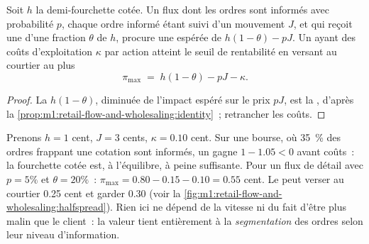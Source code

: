 \begin{proposition}\label{prop:m1:retail-flow-and-wholesaling:maxpay}
Soit $h$ la demi-fourchette cotée. Un flux dont les ordres sont informés avec
probabilité $p$, chaque ordre informé étant suivi d'un mouvement $J$, et qui
reçoit une  d'une fraction $\theta$ de $h$, procure une
 espérée de $h(1-\theta) - pJ$. Un  ayant
des coûts d'exploitation $\kappa$ par action atteint le seuil de rentabilité en versant au courtier au plus
\[
\pi_{\max} \;=\; h(1-\theta) - pJ - \kappa .
\]
\end{proposition}
\begin{proof}
La  $h(1-\theta)$, diminuée de l'impact espéré sur le prix $pJ$, est la
, d'après la \cref{prop:m1:retail-flow-and-wholesaling:identity}~;
retrancher les coûts.
\end{proof}

\begin{example}\label{ex:m1:retail-flow-and-wholesaling:twoflows}
Prenons $h = 1$ cent, $J = 3$ cents, $\kappa = 0.10$ cent. Sur une bourse,
où 35~\% des ordres frappant une cotation sont informés, un  gagne
$1 - 1.05 < 0$ avant coûts~: la fourchette cotée est, à l'équilibre, à peine
suffisante. Pour un flux de détail avec $p = 5\%$ et $\theta = 20\%$~: $\pi_{\max} =
0.80 - 0.15 - 0.10 = 0.55$ cent. Le  peut verser au courtier 0.25 cent
et garder 0.30 (voir la \cref{fig:m1:retail-flow-and-wholesaling:halfspread}). Rien
ici ne dépend de la vitesse ni du fait d'être plus malin que le client~: la valeur tient
entièrement à la \emph{segmentation} des ordres selon leur niveau d'information.
\end{example}

